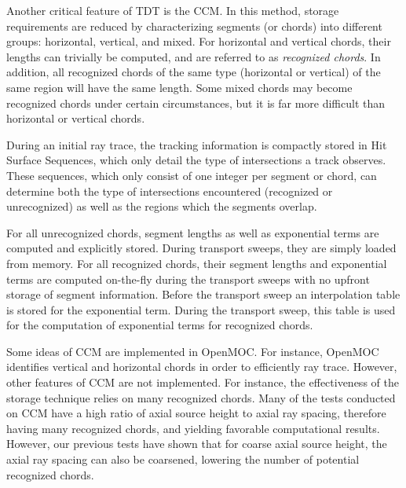 Another critical feature of TDT is the \ac{CCM}. In this method, storage requirements are reduced by characterizing segments (or chords) into different groups: horizontal, vertical, and mixed. For horizontal and vertical chords, their lengths can trivially be computed, and are referred to as \textit{recognized chords}. In addition, all recognized chords of the same type (horizontal or vertical) of the same region will have the same length. Some mixed chords may become recognized chords under certain circumstances, but it is far more difficult than horizontal or vertical chords.

During an initial ray trace, the tracking information is compactly stored in Hit Surface Sequences, which only detail the type of intersections a track observes. These sequences, which only consist of one integer per segment or chord, can determine both the type of intersections encountered (recognized or unrecognized) as well as the regions which the segments overlap.

For all unrecognized chords, segment lengths as well as exponential terms are computed and explicitly stored. During transport sweeps, they are simply loaded from memory. For all recognized chords, their segment lengths and exponential terms are computed on-the-fly during the transport sweeps with no upfront storage of segment information. Before the transport sweep an interpolation table is stored for the exponential term. During the transport sweep, this table is used for the computation of exponential terms for recognized chords. 

Some ideas of \ac{CCM} are implemented in OpenMOC. For instance, OpenMOC identifies vertical and horizontal chords in order to efficiently ray trace. However, other features of \ac{CCM} are not implemented. For instance, the effectiveness of the storage technique relies on many recognized chords. Many of the tests conducted on \ac{CCM} have a high ratio of axial source height to axial ray spacing, therefore having many recognized chords, and yielding favorable computational results. However, our previous tests have shown that for coarse axial source height, the axial ray spacing can also be coarsened, lowering the number of potential recognized chords.



